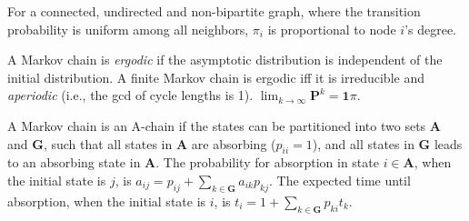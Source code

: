 For a connected, undirected and non-bipartite graph, where the transition probability is uniform among all neighbors, $\pi_i$ is proportional to node $i$'s degree.

A Markov chain is \emph{ergodic} if the asymptotic distribution is independent of the initial distribution.
A finite Markov chain is ergodic iff it is irreducible and \emph{aperiodic} (i.e., the gcd of cycle lengths is 1).
$\lim_{k\rightarrow\infty}\mathbf{P}^k = \mathbf{1}\pi$.

A Markov chain is an A-chain if the states can be partitioned into two sets $\mathbf{A}$ and $\mathbf{G}$, such that all states in $\mathbf{A}$ are absorbing ($p_{ii}=1$), and all states in $\mathbf{G}$ leads to an absorbing state in $\mathbf{A}$.
The probability for absorption in state $i\in\mathbf{A}$, when the initial state is $j$, is $a_{ij} = p_{ij}+\sum_{k\in\mathbf{G}} a_{ik}p_{kj}$.
The expected time until absorption, when the initial state is $i$, is $t_i = 1+\sum_{k\in\mathbf{G}}p_{ki}t_k$.

